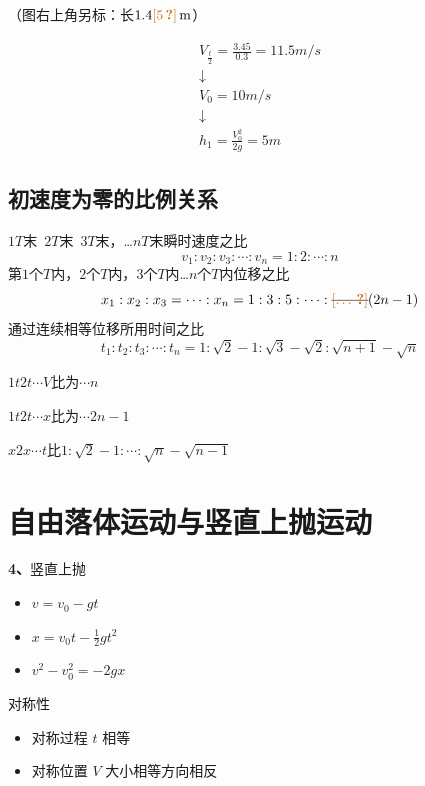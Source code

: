 \begin{problem}[②]
（图右上角另标：长$1.4\unclear{5}\unit{m}$） %
\begin{solution}
\begin{gather*}
V_{\frac t2}=\frac{3.45}{0.3}=11.5\unit{m/s}\\
\downarrow\\
V_0=10\unit{m/s}\\
\downarrow\\
h_1=\frac{V_0^{2}}{2g}=5\unit{m}
\end{gather*}
\end{solution}
\end{problem}

\subsection{初速度为零的比例关系}
$1T$末\ $2T$末\ $3T$末，…$nT$末瞬时速度之比
\[ v_1:v_2:v_3:\cdots:v_n=1:2:\cdots:n \]
第$1$个$T$内，$2$个$T$内，$3$个$T$内…$n$个$T$内位移之比
\[ x_1:x_2:x_3=\cdots:x_n=1:3:5:\cdots:\text{\struck{\unclear{…}}}(2n-1) \] %
通过连续相等位移所用时间之比
\[ t_1:t_2:t_3:\cdots:t_n=1:\sqrt{2}-1:\sqrt{3}-\sqrt{2}:\sqrt{n+1}-\sqrt{n} \] %

$1t$\quad $2t$\quad $\cdots$\quad $V$比为\quad $\cdots$\quad $n$

$1t$\quad $2t$\quad $\cdots$\quad $x$比为\quad $\cdots$\quad $2n-1$

$x$\quad $2x$\quad $\cdots$\quad $t$比\quad $1:\sqrt2-1:\cdots:\sqrt n-\sqrt{n-1}$


\section{自由落体运动与竖直上抛运动}
\textbf{4、}竖直上抛
\begin{itemize}
\item $v=v_0-gt$
\item $x=v_0t-\frac12gt^2$
\item $v^2-v_0^2=-2gx$
\end{itemize}
对称性
\begin{itemize}
\item 对称过程 $t$ 相等
\item 对称位置 $V$ 大小相等方向相反
\end{itemize}

